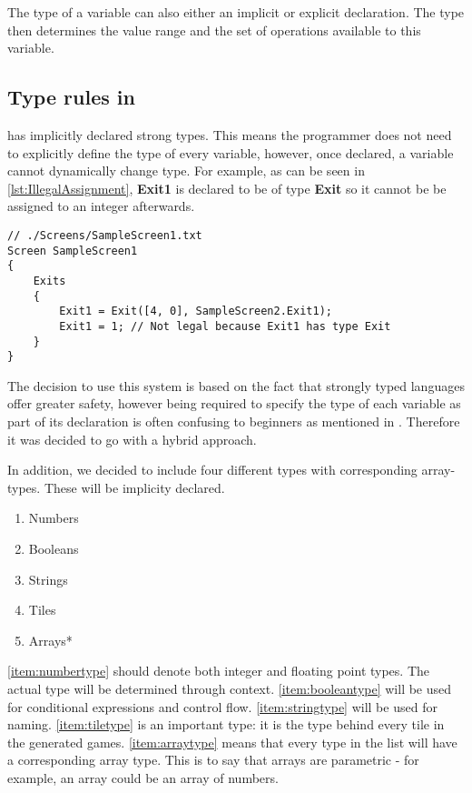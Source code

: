 The type of a variable can also either an implicit or explicit declaration.
The type then determines the value range and the set of operations available to this variable.

\subsection*{Type rules in \dazel{}}
\dazel{} has implicitly declared strong types.
This means the programmer does not need to explicitly define the type of every variable, however, once declared, a variable
cannot dynamically change type.
For example, as can be seen in \ref{lst:IllegalAssignment}, \textbf{Exit1} is declared to be of type \textbf{Exit} so it cannot be be
assigned to an integer afterwards.

\begin{lstlisting}[language=CSharp, caption={Example of an illegal assingment}, label={lst:IllegalAssignment},escapechar=|]
// ./Screens/SampleScreen1.txt
Screen SampleScreen1 
{
    Exits 
    {
        Exit1 = Exit([4, 0], SampleScreen2.Exit1);
        Exit1 = 1; // Not legal because Exit1 has type Exit
    }
}
\end{lstlisting}

The decision to use this system is based on the fact that strongly typed languages offer greater safety, however being required to
specify the type of each variable as part of its declaration is often confusing to beginners as mentioned in .
Therefore it was decided to go with a hybrid approach.

In addition, we decided to include four different types with corresponding array-types. These will be implicity declared.

\begin{multicols}{3}
    \begin{enumerate}
        \item Numbers\label{item:numbertype}
        \item Booleans\label{item:booleantype}
        \item Strings\label{item:stringtype}
        \item Tiles\label{item:tiletype}
        \item Arrays*\label{item:arraytype}
    \end{enumerate}
\end{multicols}

\ref{item:numbertype} should denote both integer and floating point types. The actual type will be determined through context. \ref{item:booleantype} will be used for conditional expressions and control flow.
\ref{item:stringtype} will be used for naming.
\ref{item:tiletype} is an important type: it is the type behind every tile in the generated games.
\ref{item:arraytype} means that every type in the list will have a corresponding array type. This is to say that arrays are parametric - for example, an array could be an array of numbers.

